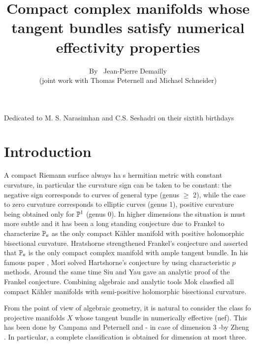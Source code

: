 \title{Compact complex manifolds whose tangent bundles satisfy numerical effectivity properties}

\author{By~ Jean-Pierre Demailly\\(joint work with Thomas Peternell and Michael Schneider)}

\date{}
\maketitle
\begin{center}
Dedicated to M. S. Narasimhan and C.S. Seshadri on their sixtith birthdays
\end{center}

\setcounter{section}{-1}
\section{Introduction}\label{art5-sec-0}
A compact Riemann surface always ha s hermitian metric with constant curvature, in particular the curvature sign can be taken to be constant: the negative sign corresponds to curves of general type (genus $\geq$ 2), while the case to zero curvature corresponds to elliptic curves (genus 1), positive curvature being obtained only for $\mathbb{P}^{1}$ (genus 0). In higher dimensions the situation is must more subtle and it has been a long standing conjecture due to Frankel to characterize $\mathbb{P}_{n}$ as the only compact K\"ahler manifold with positive holomorphic bisectional curvature. Hratshorne strengthened Frankel's conjecture and asserted that $\mathbb{P}_{n}$ is the only compact complex manifold with ample tangent bundle. In his famous paper \cite{art5-keyMo79}, Mori solved Hartshorne's conjecture by using characteristic $p$ methods. Around the same time Siu and Yau \cite{SY80} gave an analytic proof of the Frankel conjecture. Combining algebraic and analytic tools Mok \cite{art5-keyMk88} classfied all compact K\"ahler manifolds with semi-positive holomorphic bisectional curvature. 

From the point of view of algebraic geometry, it is natural to consider the class fo projective manifolds $X$ whose tangent bundle in numerically effective (nef). This has been done by Campana and Peternell \cite{art5-keyCP91} and - in case of dimension 3 -by Zheng \cite{art5-keyZh90}. In particular, a complete classification is obtained for dimension at most three.

